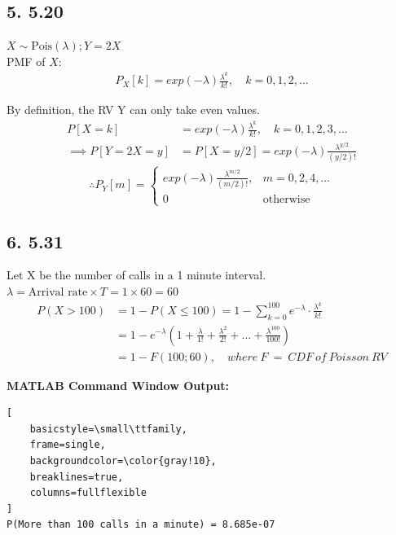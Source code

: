 \documentclass[12pt]{article}
\begin{document}
\subsection*{5. 5.20}
\label{subsec:1.5}

$X \sim \text{Pois}(\lambda); Y = 2X$ \\
PMF of $X$:\\
\begin{align*}
    P_X[k] = exp(-\lambda) \frac{\lambda^k}{k!}, \quad k=0,1,2, \dots
\end{align*}

\noindent By definition, the RV Y can only take even values.
\begin{align*}
    P[X=k] &=  exp(-\lambda) \frac{\lambda^k}{k!}, \quad k=0,1,2,3, \dots \\
    \implies P[Y = 2X = y] &= P[X = y/2] =  exp(-\lambda) \frac{\lambda^{y/2}}{(y/2)!}
\end{align*}
\begin{equation*}
    \therefore P_Y[m] = \begin{cases} exp(-\lambda) \frac{\lambda^{m/2}}{(m/2)!}, & m=0,2,4, \dots \\[10pt] 0 & \text{otherwise} \end{cases}
\end{equation*}

\subsection*{6. 5.31}
\label{subsec:1.6}

Let X be the number of calls in a 1 minute interval. \\
$\lambda = \text{Arrival rate} \times T = 1 \times 60 = 60$
\begin{align*}
    P(X > 100) &= 1 - P(X \le 100) = 1 - \sum_{k=0}^{100} e^{-\lambda} \cdot \frac{\lambda^k}{k!} \\[10pt]
    &= 1 - e^{-\lambda}\left(1 + \frac{\lambda}{1!} + \frac{\lambda^2}{2!} + \dots + \frac{\lambda^{100}}{100!}\right)\\[10pt]
    &= 1 - F(100; 60), \quad where\ F\ =\ CDF\ of\ Poisson\ RV
\end{align*}



\noindent \textbf{MATLAB Command Window Output:}
\begin{lstlisting}[
    basicstyle=\small\ttfamily, 
    frame=single, 
    backgroundcolor=\color{gray!10},
    breaklines=true,
    columns=fullflexible
]
P(More than 100 calls in a minute) = 8.685e-07
\end{lstlisting}
\end{document}
